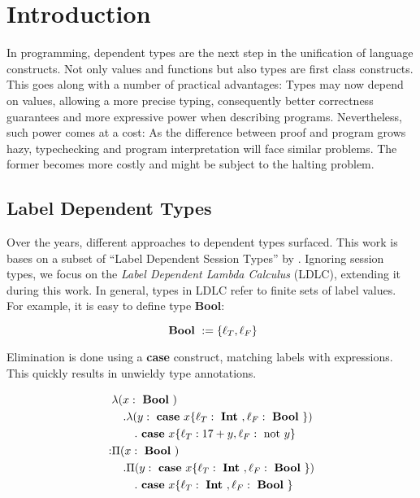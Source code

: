 
\newcommand{\case}{\text{ \textbf{case} }}
\newcommand{\Bool}{\text{ \textbf{Bool} }}
\newcommand{\Int}{\text{ \textbf{Int} }}
\newcommand{\notf}{\text{ not }}

\chapter{Introduction}\label{chap:introduction}

In programming, dependent types are the next step in the unification of language constructs. Not only values and functions but also types are first class constructs. This goes along with a number of practical advantages: Types may now depend on values, allowing a more precise typing, consequently better correctness guarantees and more expressive power when describing programs. Nevertheless, such power comes at a cost: As the difference between proof and program grows hazy, typechecking and program interpretation will face similar problems. The former becomes more costly and might be subject to the halting problem.

\section{Label Dependent Types}

Over the years, different approaches to dependent types surfaced. This work is bases on a subset of ``Label Dependent Session Types'' by \cite{thiemann2019}. Ignoring session types, we focus on the \emph{Label Dependent Lambda Calculus} (LDLC), extending it during this work. In general, types in LDLC refer to finite sets of label values. For example, it is easy to define type \textbf{Bool}:

\begin{equation}\label{eqn:bool}
\Bool    := \{\ell_T, \ell_F\}
\end{equation}

Elimination is done using a \textbf{case} construct, matching labels with expressions. This quickly results in unwieldy type annotations.

\begin{equation}\label{eqn:ldlc}
\begin{split}
&\lambda (x: \Bool) \\
&\quad . \lambda (y: \case x \{\ell_T: \Int, \ell_F: \Bool\} ) \\
&\qquad . \case x \{\ell_T: 17+y,\ell_F: \notf y\} \\
: & \Pi(x : \Bool) \\
&\quad . \Pi (y: \case x \{\ell_T: \Int, \ell_F: \Bool\} ) \\
&\qquad . \case x \{\ell_T: \Int, \ell_F: \Bool \}
\end{split}
\end{equation}

